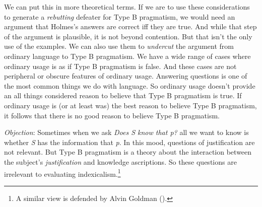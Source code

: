 \documentclass[
  11pt,
  letterpaper,
  DIV=11,
  numbers=noendperiod,
  twoside]{scrartcl}
\begin{document}
We can put this in more theoretical terms. If we are to use these
considerations to generate a \emph{rebutting} defeater for Type B
pragmatism, we would need an argument that Holmes's answers are correct
iff they are true. And while that step of the argument is plausible, it
is not beyond contention. But that isn't the only use of the examples.
We can also use them to \emph{undercut} the argument from ordinary
language to Type B pragmatism. We have a wide range of cases where
ordinary usage is as if Type B pragmatism is false. And these cases are
not peripheral or obscure features of ordinary usage. Answering
questions is one of the most common things we do with language. So
ordinary usage doesn't provide an all things considered reason to
believe that Type B pragmatism is true. If ordinary usage is (or at
least was) the best reason to believe Type B pragmatism, it follows that
there is no good reason to believe Type B pragmatism.

\emph{Objection}: Sometimes when we ask \emph{Does S know that p?} all
we want to know is whether \emph{S} has the information that \emph{p}.
In this mood, questions of justification are not relevant. But Type B
pragmatism is a theory about the interaction between the subject's
\emph{justification} and knowledge ascriptions. So these questions are
irrelevant to evaluating indexicalism.\footnote{A similar view is
  defended by Alvin Goldman ().}
\end{document}
